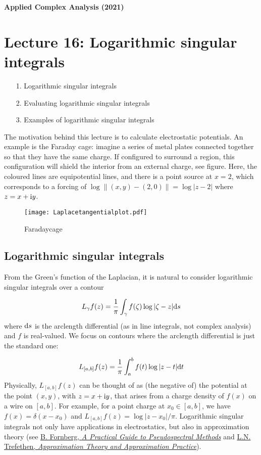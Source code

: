 \documentclass[12pt,a4paper]{article}
\def\D{ {\rm d} }
\def\I{ {\rm i} }
\def\dt{\D t}
\begin{document}
\textbf{Applied Complex Analysis (2021)}

\section{Lecture 16: Logarithmic singular integrals}
\begin{itemize}
\item[1. ] Logarithmic singular integrals


\item[2. ] Evaluating logarithmic singular integrals


\item[3. ] Examples of logarithmic singular integrals

\end{itemize}
The motivation behind this lecture is to calculate electrostatic potentials. An example is the Faraday cage: imagine a series of metal plates connected together so that they have the same charge. If configured to surround a region, this configuration will shield the interior from an external charge, see figure. Here, the coloured lines are equipotential lines, and there is a point source at $x = 2$, which corresponds to a forcing of $\log\| (x,y)  - (2,0) \| = \log|z - 2|$ where  $z = x + \I y$.

\begin{figure}
\centering
\texttt{[image: Laplacetangentialplot.pdf]}
\caption{Faradaycage}
\end{figure}


\subsection{Logarithmic singular integrals}
From the Green's function of the Laplacian, it is natural to consider logarithmic singular integrals over a contour

\[
L_\gamma f(z) = {1 \over \pi} \int_\gamma f(\zeta) \log|\zeta-z| \D s
\]
where $\D s$ is the arclength differential (as in line integrals, not complex analysis) and $f$ is real-valued. We focus on contours where the arclength differential is just the standard one:

\[
L_{[a,b]} f(z) = {1 \over \pi }\int_a^b f(t) \log | z - t| \dt
\]
Physically, $L_{[a,b]} f(z)$ can be thought of as (the negative of) the potential at the point $(x, y)$, with $z = x + \I y$, that arises from a charge density of $f(x)$ on a wire on $[a, b]$.  For example, for a point charge at $x_0 \in [a, b]$, we have $f(x) = \delta(x-x_0)$ and  $L_{[a,b]} f(z) = \log | z - x_0|/\pi$. Logarithmic singular integrals not only have applications in electrostatics, but also in approximation theory (see \href{https://www.imperial.ac.uk/admin-services/library/}{B. Fornberg, \emph{A Practical Guide to Pseudospectral Methods}} and \href{https://www.imperial.ac.uk/admin-services/library/}{L.N. Trefethen, \emph{Approximation Theory and Approximation Practice}}).
\end{document}
